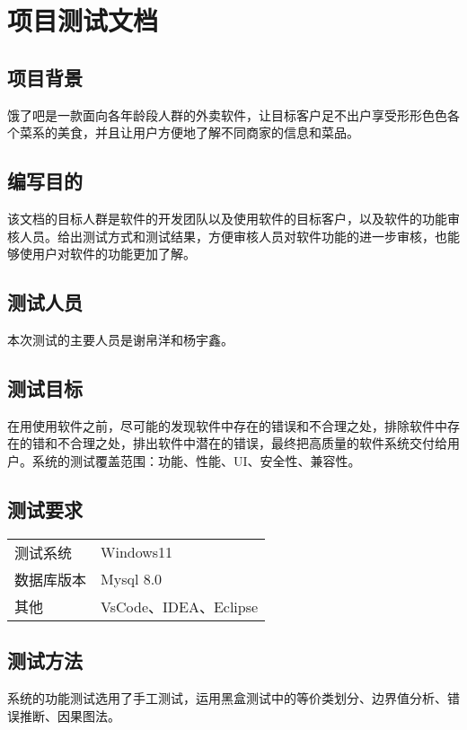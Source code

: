 
\chapter{项目测试文档}

\section{项目背景}

  饿了吧是一款面向各年龄段人群的外卖软件，让目标客户足不出户享受形形色色各个菜系的美食，并且让用户方便地了解不同商家的信息和菜品。
  \section{编写目的}
  

  该文档的目标人群是软件的开发团队以及使用软件的目标客户，以及软件的功能审核人员。给出测试方式和测试结果，方便审核人员对软件功能的进一步审核，也能够使用户对软件的功能更加了解。
  
  \section{测试人员}

  本次测试的主要人员是谢帛洋和杨宇鑫。

  \section{测试目标}
  在用使用软件之前，尽可能的发现软件中存在的错误和不合理之处，排除软件中存在的错和不合理之处，排出软件中潜在的错误，最终把高质量的软件系统交付给用户。系统的测试覆盖范围：功能、性能、UI、安全性、兼容性。

  \section{测试要求}

\begin{longtable}[]{@{}ll@{}}
\toprule
测试系统 & Windows11\tabularnewline
数据库版本 & Mysql 8.0\tabularnewline
其他 & VsCode、IDEA、Eclipse\tabularnewline
\bottomrule
\end{longtable}

\section{测试方法}

系统的功能测试选用了手工测试，运用黑盒测试中的等价类划分、边界值分析、错误推断、因果图法。


